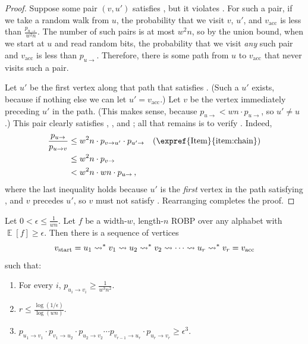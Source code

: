 \documentclass{toc}
\DeclareMathOperator*{\ExpVal}{\mathbb{E}}
\begin{document}
\begin{proof}
Suppose some pair $(v, u')$ satisfies , but it violates . For such a pair, if we take a random walk from $u$, the probability that we visit $v$, $u'$, and $v_{\text{acc}}$ is less than $\frac{p_{u \to}}{w^2 n}$. The number of such pairs is at most $w^2 n$, so by the union bound, when we start at $u$ and read random bits, the probability that we visit \emph{any} such pair and $v_{\text{acc}}$ is less than $p_{u \to}$. Therefore, there is some path from $u$ to $v_{\text{acc}}$ that never visits such a pair.

Let $u'$ be the first vertex along that path that satisfies . (Such a $u'$ exists, because if nothing else we can let $u' = v_{\text{acc}}$.) Let $v$ be the vertex immediately preceding $u'$ in the path. (This makes sense, because $p_{u \to} < wn \cdot p_{u \to}$, so $u' \neq u$.) This pair clearly satisfies , , and ; all that remains is to verify . Indeed,
\begin{align*}
\frac{p_{u \to}}{p_{u \to v}} &\leq w^2 n \cdot p_{v \to u'} \cdot p_{u' \to} && \text{(\expref{Item}{item:chain})} \\
&\leq w^2 n \cdot p_{v \to} \\
&< w^2 n \cdot wn \cdot p_{u \to}\,,
\end{align*}
where the last inequality holds because $u'$ is the \emph{first} vertex in the path satisfying , and $v$ precedes $u'$, so $v$ must not satisfy . Rearranging completes the proof.
\end{proof}

\begin{corollary} \label{cor:structural}
Let $0 < \epsilon \leq \frac{1}{wn}$. Let $f$ be a width-$w$, length-$n$ ROBP over any alphabet with $\ExpVal[f] \geq \epsilon$. Then there is a sequence of vertices 
$$
v_{\normalfont\text{start}} = u_1 \leadsto^* v_1 \leadsto u_2 \leadsto^* v_2 \leadsto \cdots \leadsto u_r \leadsto^* v_r = v_{\normalfont\text{acc}}
$$
such that:
\begin{enumerate}
\item For every $i$, $p_{u_i \to v_i} \geq \frac{1}{w^3 n^2}$. \label{item:long-hops}
\item $r \leq \frac{\log(1/\epsilon)}{\log(wn)}$. \label{item:full-chain-length}
\item $p_{u_1 \to v_1} \cdot p_{v_1 \to u_2} \cdot p_{u_2 \to v_2} \cdots p_{v_{r - 1} \to u_r} \cdot p_{u_r \to v_r} \geq \epsilon^3$. \label{item:full-chain}
\end{enumerate}
\end{corollary}
\end{document}
